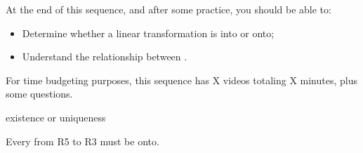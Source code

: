 







At the end of this sequence, and after some practice, you should be able to:

\begin{itemize}
\item Determine whether a linear transformation is into or onto;
\item Understand the relationship between .  
\end{itemize}


For time budgeting purposes, this sequence has X videos totaling X minutes, 
plus some questions.  




\endedxtext

\endedxvertical







existence or uniqueness

\endedxvertical








Every from R5 to R3 must be onto.

\endedxvertical







\endedxvertical